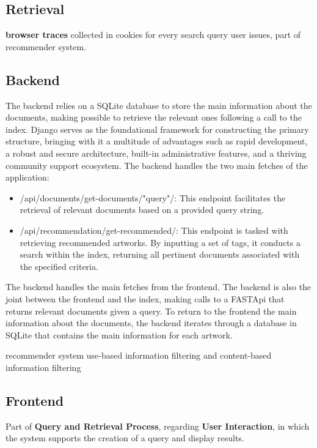 \documentclass[12pt]{spieman}  %
\begin{document}
\begin{spacing}{1}
    \section{Retrieval}

    \textbf{browser traces} collected in cookies for every search query user issues, part of recommender system.

    \subsection{Backend}\label{sec:backend}
    The backend relies on a SQLite database to store the main information about the documents,
    making possible to retrieve the relevant ones following a call to the index.\newline
    Django serves as the foundational framework for constructing the primary structure,
    bringing with it a multitude of advantages such as rapid development, a robust and secure architecture,
    built-in administrative features, and a thriving community support ecosystem.\newline
    The backend handles the two main fetches of the application:
    \begin{itemize}
        \item /api/documents/get-documents/"query"/:
              This endpoint facilitates the retrieval of relevant documents based on a provided query string.
        \item /api/recommendation/get-recommended/:
              This endpoint is tasked with retrieving recommended artworks.
              By inputting a set of tags, it conducts a search within the index,
              returning all pertinent documents associated with the specified criteria.
    \end{itemize}
    The backend handles the main fetches from the frontend.
    The backend is also the joint between the frontend and the index,
    making calls to a FASTApi that returns relevant documents given a query.
    To return to the frontend the main information about the documents,
    the backend iterates through a database in SQLite that contains the main information
    for each artwork.


    recommender system
    use-based information filtering and content-based information filtering

    \subsection{Frontend}\label{sec:frontend}
    Part of \textbf{Query and Retrieval Process}, regarding \textbf{User Interaction},
    in which the system supports the creation of a query and display results.


\end{spacing}
\end{document}
